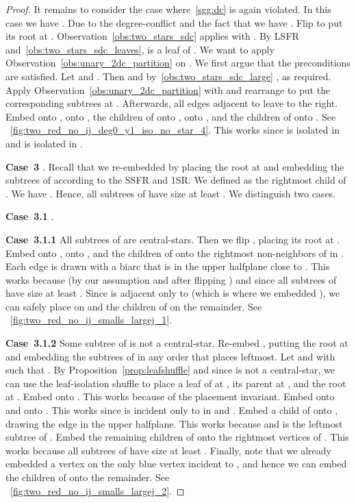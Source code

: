 \documentclass[11pt,a4paper,colorlinks=true,urlcolor=blue,citecolor=red]{article}
\theoremstyle{plain}
\newcommand{\case}[1]{\par\vspace{.5\baselineskip}\noindent\textbf{\sffamily Case~#1}}
\begin{document}
\begin{proof}
  It remains to consider the case where~\ref{sgg:dc} is again violated.
  In this case we have . Due to the
  degree-conflict and the fact that  we have . Flip  to put its root at .
  Observation~\ref{obs:two_stars_sdc} applies with . By LSFR
  and~\ref{obs:two_stars_sdc_leaves},  is a leaf of . We want
  to apply Observation~\ref{obs:unary_2dc_partition} on . We
  first argue that the preconditions are satisfied. Let
   and . Then  and by~\ref{obs:two_stars_sdc_large} , as required. Apply
  Observation~\ref{obs:unary_2dc_partition} with  and
  rearrange  to put the corresponding subtrees at .
  Afterwards, all edges adjacent to  leave  to the right. Embed
   onto ,  onto , the children of  onto , 
  onto , and the children of  onto . See
  \figurename~\ref{fig:two_red_no_ij_deg0_y1_iso_no_star_4}. This works
  since  is isolated in  and  is isolated in .

  \case{3} . Recall that we re-embedded
   by placing the root at  and embedding the subtrees of 
  according to the SSFR and 1SR. We defined  as the rightmost child
  of . We have . Hence, all
  subtrees of  have size at least . We distinguish two
  cases.

  \case{3.1} .

  \case{3.1.1} All subtrees of  are central-stars. Then we flip
  , placing its root at . Embed  onto ,  onto ,
  and the children of  onto the rightmost  non-neighbors
  of  in . Each edge is drawn with a biarc that is in the
  upper halfplane close to . This works because  (by
  our assumption and after flipping ) and since all subtrees of
   have size at least . Since  is adjacent only to 
  (which is where we embedded ), we can safely place  on  and
  the children of  on the remainder. See
  \figurename~\ref{fig:two_red_no_ij_smalls_largej_1}.

  \case{3.1.2} Some subtree  of  is not a central-star. Re-embed
  , putting the root at  and embedding the subtrees of  in
  any order that places  leftmost. Let  and  with  such
  that . By Proposition~\ref{prop:leafshuffle} and since 
  is not a central-star, we can use the leaf-isolation shuffle to place
  a leaf of  at , its parent at , and the root at .
  Embed  onto . This works because of the placement invariant.
  Embed  onto  and  onto . This works since  is
  incident only to  in  and . Embed a
  child of  onto , drawing the edge in the upper halfplane. This
  works because  and  is the leftmost subtree of
  . Embed the remaining children of  onto the rightmost vertices
  of . This works because all subtrees of  have size at
  least . Finally, note that we already embedded a vertex on the
  only blue vertex incident to , and hence we can embed the
  children of  onto the remainder. See
  \figurename~\ref{fig:two_red_no_ij_smalls_largej_2}.


\end{proof}
\end{document}
